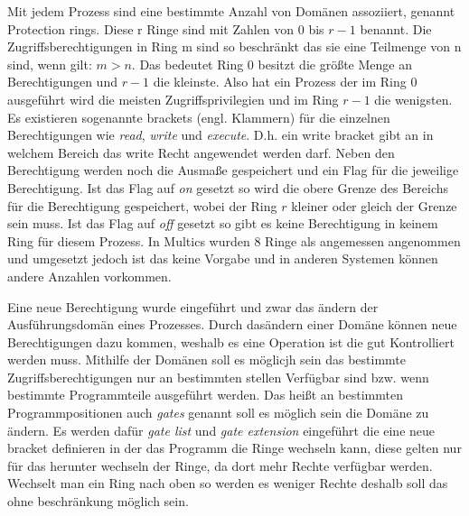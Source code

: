 \documentclass[german, 9pt,technote]{IEEEtran}
\begin{document}
        Mit jedem Prozess sind eine bestimmte Anzahl von Dom\"anen assoziiert, genannt Protection rings. Diese r Ringe sind mit Zahlen von $0$ bis $r - 1$ benannt.
        Die Zugriffsberechtigungen in Ring m sind so beschr\"ankt das sie eine Teilmenge von n sind, wenn gilt: $m > n$. Das bedeutet
        Ring $0$ besitzt die gr\"o\ss te Menge an Berechtigungen und $r-1$ die kleinste. Also hat ein Prozess der im Ring $0$ ausgef\"uhrt wird
        die meisten Zugriffsprivilegien und im Ring $r-1$ die wenigsten. Es existieren sogenannte brackets (engl. Klammern) f\"ur die einzelnen Berechtigungen
        wie \textit{read}, \textit{write} und \textit{execute}. D.h. ein write bracket gibt an in welchem Bereich das write Recht angewendet werden darf. Neben den 
        Berechtigung werden noch die Ausma\ss e gespeichert und ein Flag f\"ur die jeweilige Berechtigung. Ist das Flag auf \textit{on} gesetzt 
        so wird die obere Grenze des Bereichs f\"ur die Berechtigung gespeichert, wobei der Ring $r$ kleiner oder gleich der Grenze sein muss.
        Ist das Flag auf \textit{off} gesetzt so gibt es keine Berechtigung in keinem Ring f\"ur diesem Prozess. In Multics wurden 8 Ringe als angemessen 
        angenommen und umgesetzt jedoch ist das keine Vorgabe und in anderen Systemen k\"onnen andere Anzahlen vorkommen.
    
        Eine neue Berechtigung wurde eingef\"uhrt und zwar das \"andern der Ausf\"uhrungsdom\"an eines Prozesses.
        Durch das\"andern einer Dom\"ane k\"onnen neue Berechtigungen dazu kommen, weshalb es eine Operation ist die gut Kontrolliert werden muss.
        Mithilfe der Dom\"anen soll es m\"oglicjh sein das bestimmte Zugriffsberechtigungen nur an bestimmten stellen Verf\"ugbar  sind bzw. wenn bestimmte Programmteile 
        ausgef\"uhrt werden. Das hei\ss t an bestimmten Programmpositionen auch \textit{gates} genannt soll es m\"oglich sein die Dom\"ane zu \"andern.
        Es werden daf\"ur \textit{gate list} und \textit{gate extension} eingef\"uhrt die eine neue bracket definieren in der das Programm die Ringe wechseln kann, diese
        gelten nur f\"ur das herunter wechseln der Ringe, da dort mehr Rechte verf\"ugbar werden. Wechselt man ein Ring nach oben so werden es weniger Rechte deshalb
        soll das ohne beschr\"ankung m\"oglich sein. 
    
    
\end{document}
